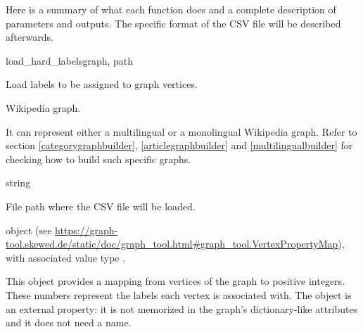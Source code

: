            Here is a summary of what each function does and a complete description of parameters and outputs. The specific format of the CSV file will be described afterwards.
            \begin{independentfunctiondoc}{load\_hard\_labels}{graph, path}
                \begin{functiondescription}
                    Load  labels to be assigned to graph vertices.
                \end{functiondescription}
                
                \begin{functionparameters}
                    \item[graph] 
                    
                    Wikipedia graph.
                    
                    It can represent either a multilingual or a monolingual Wikipedia graph. Refer to section \ref{categorygraphbuilder}, \ref{articlegraphbuilder} and \ref{multilingualbuilder} for checking how to build such specific graphs.
                    \item[path] string
                    
                    File path where the CSV file will be loaded.
                \end{functionparameters}
                
                \begin{functionoutput}
                     object (see \url{https://graph-tool.skewed.de/static/doc/graph_tool.html\#graph_tool.VertexPropertyMap}), with associated value type .
                    
                    This object provides a mapping from vertices of the graph to positive integers. These numbers represent the  labels each vertex is associated with. The object is an external property: it is not memorized in the graph's dictionary-like attributes and it does not need a name.
                \end{functionoutput}
            \end{independentfunctiondoc}
